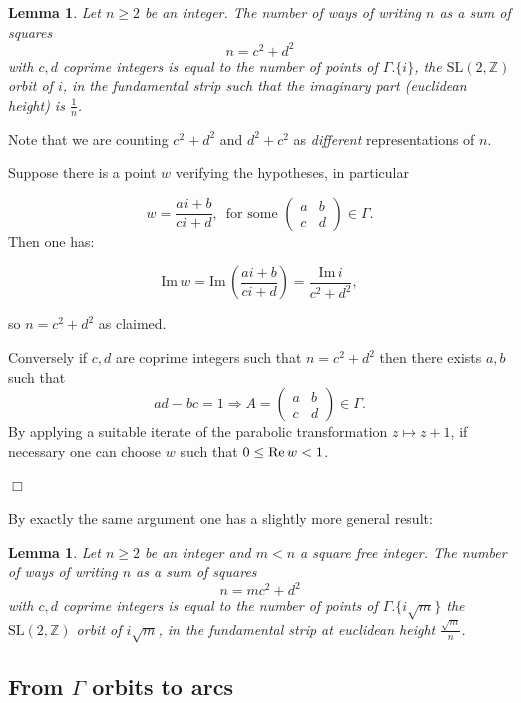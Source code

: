 \documentclass[12pt,a4paper]{amsart}
\newtheorem{lem}[thm]{Lemma}
\def\im{\mathrm{Im}\,}
\def\ZZ{\mathbb{Z}}
\def\sl2{\mathrm{SL}(2, \ZZ)}
\def\oi{\Gamma.\{i\}}
\begin{document}
\begin{lem} \label{squares}
Let $n\geq2$ be an integer.
The number of  ways of writing $n$  as a  sum of squares
$$n = c^2 + d^2$$
with $c,d$ coprime integers
is equal to the number of points
of $\oi$, 
the $\sl2$  orbit of $i$,
in the fundamental strip such that the imaginary part (euclidean height) is $\frac{1}{n}$.
\end{lem}
Note that we are counting $c^2 + d^2$ and $d^2 + c^2$ 
as \textit{different} representations of $n$.

\proof  Suppose there is a point $w$
verifying the hypotheses, in particular

$$w = \frac{ai + b}{ci + d},\, 
\text{ for some } \begin{pmatrix} a&b\\c&d
\end{pmatrix} \in \Gamma.$$
Then one has:

$$\im w = \im  \left (\frac{ai +b}{ci+d } \right)
= \frac{\im i} {c^2 + d^2},$$

so $n = c^2 + d^2$ as claimed.

Conversely if $c,d$ are coprime integers
such that $n=c^2 +d^2$
 then there exists $a,b$ such that
 $$ad - bc = 1 \Rightarrow  
A =  \begin{pmatrix}
 a & b \\
 c & d
 \end{pmatrix} \in \Gamma.
$$
By applying a suitable iterate of the parabolic transformation 
$z \mapsto z + 1$, if necessary 
one can choose $w$ such that $0 \leq \text{Re\,} w < 1$.

\hfill $\Box$

By exactly the same argument one has a slightly more general result:

\begin{lem} \label{quadratic form}
Let $n\geq2$ be an integer and $m < n$ a square free integer.
The number of  ways of writing $n$  as a  sum of squares
$$n = mc^2 + d^2$$
with $c,d$ coprime integers
is equal to the number of points
of $\Gamma.\{i\sqrt m\}  $
the $\sl2$  orbit of $i\sqrt m$,
in the fundamental strip at euclidean height $\frac{\sqrt m}{n}$.
\end{lem}


\subsection{From $\Gamma$ orbits to arcs}
\end{document}
